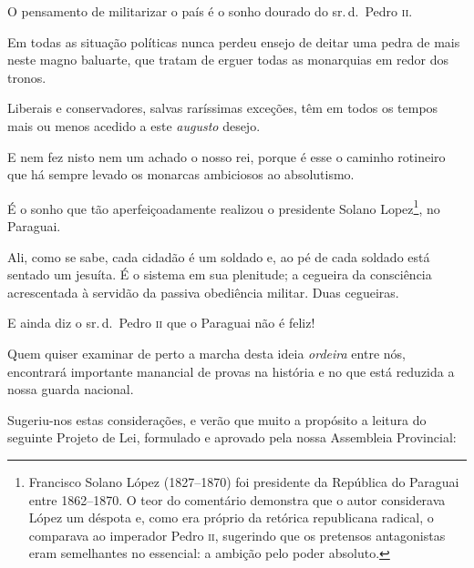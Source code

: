 O pensamento de militarizar o país é o sonho dourado do sr.\,d.~Pedro \textsc{ii}.

Em todas as situação políticas nunca perdeu ensejo de deitar uma pedra
de mais neste magno baluarte, que tratam de erguer todas as monarquias
em redor dos tronos.

Liberais e conservadores, salvas raríssimas exceções, têm em todos os
tempos mais ou menos acedido a este \emph{augusto} desejo.

E nem fez nisto nem um achado o nosso rei, porque é esse o caminho
rotineiro que há sempre levado os monarcas ambiciosos ao absolutismo.

É o sonho que tão aperfeiçoadamente realizou o presidente Solano
Lopez\footnote{Francisco Solano López (1827--1870) foi presidente da
  República do Paraguai entre 1862--1870. O teor do comentário demonstra
  que o autor considerava López um déspota e, como era próprio da
  retórica republicana radical, o comparava ao imperador Pedro \textsc{ii},
  sugerindo que os pretensos antagonistas eram semelhantes no essencial:
  a ambição pelo poder absoluto.}, no Paraguai.

Ali, como se sabe, cada cidadão é um soldado e, ao pé de cada soldado
está sentado um jesuíta. É o sistema em sua plenitude; a cegueira da
consciência acrescentada à servidão da passiva obediência militar. Duas
cegueiras.

E ainda diz o sr.\,d.~Pedro \textsc{ii} que o Paraguai não é feliz!

Quem quiser examinar de perto a marcha desta ideia \emph{ordeira} entre
nós, encontrará importante manancial de provas na história e no que está
reduzida a nossa guarda nacional.

Sugeriu-nos estas considerações, e verão que muito a propósito a leitura
do seguinte Projeto de Lei, formulado e aprovado pela nossa Assembleia
Provincial:

